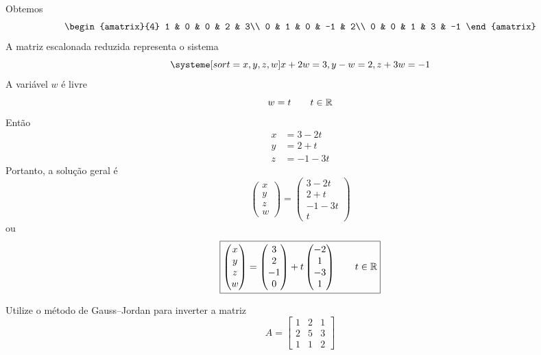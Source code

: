 \documentclass[a4paper,12pt,fleqn]{article}
\begin{document}
\begin{answer}
\[\]
Obtemos
\[
\begin{amatrix}{4}
  1 & 0 & 0 &  2 &  3\\
  0 & 1 & 0 & -1 &  2\\
  0 & 0 & 1 &  3 & -1
\end{amatrix}
\]
A matriz escalonada reduzida representa o sistema
\[
\systeme[sort={x,y,z,w}]{
  x+2w=3,
  y-w=2,
  z+3w=-1
}
\]
A variável $w$ é livre
\[
w=t
\qquad t\in\mathbb{R}
\]
Então
\begin{align*}
x&=3-2t\\
y&=2+t\\
z&=-1-3t
\end{align*}
Portanto, a solução geral é
\[
\begin{pmatrix}
x\\y\\z\\w
\end{pmatrix}
=
\begin{pmatrix}
3-2t\\
2+t\\
-1-3t\\
t
\end{pmatrix}
\]
ou
\[
\boxed{
\begin{pmatrix}
x\\y\\z\\w
\end{pmatrix}
=
\begin{pmatrix}
3\\2\\-1\\0
\end{pmatrix}
+
t
\begin{pmatrix}
-2\\1\\-3\\1
\end{pmatrix}
\qquad t\in\mathbb{R}
}
\]
\end{answer}

Utilize o método de Gauss--Jordan para inverter a matriz
\[
A=
\begin{bmatrix}
  1 & 2 & 1\\
  2 & 5 & 3\\
  1 & 1 & 2
\end{bmatrix}
\]
\end{document}
